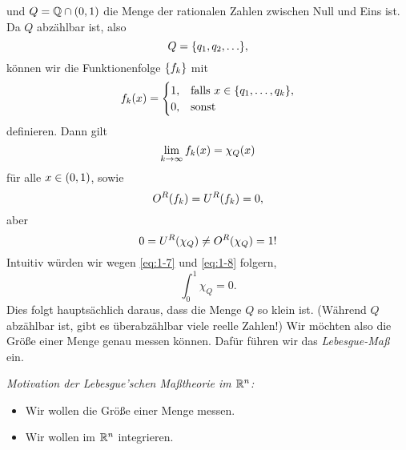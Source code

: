 und \(Q = \Q \cap \parentheses*{0, 1}\) die Menge der rationalen Zahlen zwischen Null und Eins ist.
Da \(Q\) abzählbar ist, also
\[
	Q = \braces*{q_1, q_2, \ldots},
\]
können wir die Funktionenfolge \(\braces*{f_k}\) mit
\[
	f_k\parentheses*{x} = \begin{cases}
		1, & \text{falls }x \in \braces*{q_1, \ldots, q_k},\\
		0, & \text{sonst}
	\end{cases}
\]
definieren.
Dann gilt
\begin{equation}\label{eq:1-7}
	\lim_{k \to \infty}f_k\parentheses*{x} = \chi_Q\parentheses*{x}
\end{equation}
für alle \(x \in \parentheses*{0, 1}\), sowie
\begin{equation}\label{eq:1-8}
	O^R\parentheses*{f_k} = U^R\parentheses*{f_k} = 0,
\end{equation}
aber
\[
	0 = U^R\parentheses*{\chi_Q} \ne O^R\parentheses*{\chi_Q} = 1\text{!}
\]
Intuitiv würden wir wegen \eqref{eq:1-7} und \eqref{eq:1-8} folgern,
\[
	\int_0^1 \chi_Q = 0.
\]
Dies folgt hauptsächlich daraus, dass die Menge \(Q\) so klein ist.
(Während \(Q\) abzählbar ist, gibt es überabzählbar viele reelle Zahlen!)
Wir möchten also die Größe einer Menge genau messen können.
Dafür führen wir das \emph{Lebesgue-Maß} ein.

\emph{Motivation der Lebesgue'schen Maßtheorie im \(\R^n\):}
\begin{itemize}
	\item Wir wollen die Größe einer Menge messen.
	\item Wir wollen im \(\R^n\) integrieren.
\end{itemize}

